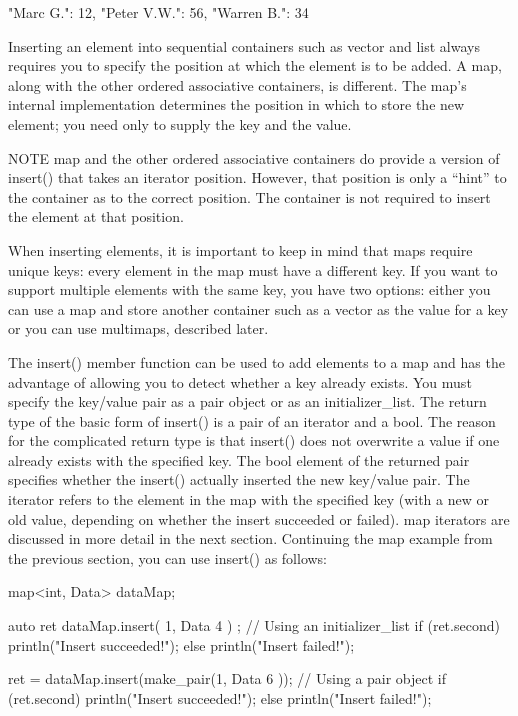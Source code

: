 \begin{cpp}
{"Marc G.": 12, "Peter V.W.": 56, "Warren B.": 34}
\end{cpp}


Inserting an element into sequential containers such as vector and list always requires you to specify the position at which the element is to be added. A map, along with the other ordered associative containers, is different. The map’s internal implementation determines the position in which to store the new element; you need only to supply the key and the value.

\begin{myNotic}{NOTE}
map and the other ordered associative containers do provide a version of insert() that takes an iterator position. However, that position is only a “hint” to the container as to the correct position. The container is not required to insert the element at that position.
\end{myNotic}

When inserting elements, it is important to keep in mind that maps require unique keys: every element in the map must have a different key. If you want to support multiple elements with the same key, you have two options: either you can use a map and store another container such as a vector as the value for a key or you can use multimaps, described later.


The insert() member function can be used to add elements to a map and has the advantage of allowing you to detect whether a key already exists. You must specify the key/value pair as a pair object or as an initializer\_list. The return type of the basic form of insert() is a pair of an iterator and a bool. The reason for the complicated return type is that insert() does not overwrite a value if one already exists with the specified key. The bool element of the returned pair specifies whether the insert() actually inserted the new key/value pair. The iterator refers to the element in the map with the specified key (with a new or old value, depending on whether the insert succeeded or failed). map iterators are discussed in more detail in the next section. Continuing the map example from the previous section, you can use insert() as follows:

\begin{cpp}
map<int, Data> dataMap;

auto ret { dataMap.insert({ 1, Data { 4 } }) }; // Using an initializer_list
if (ret.second) { println("Insert succeeded!"); }
else { println("Insert failed!"); }

ret = dataMap.insert(make_pair(1, Data { 6 })); // Using a pair object
if (ret.second) { println("Insert succeeded!"); }
else { println("Insert failed!"); }
\end{cpp}

